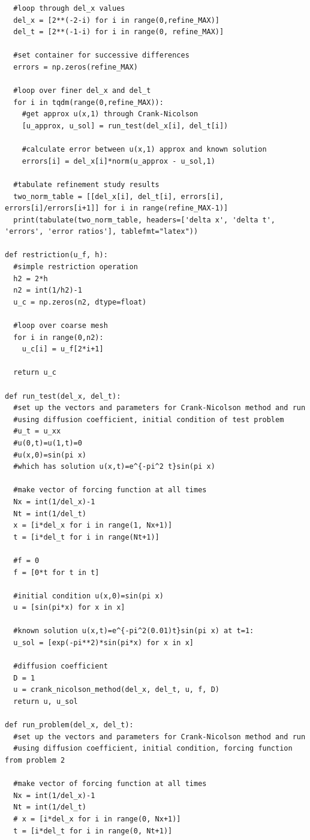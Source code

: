 \documentclass[12pt]{article}
\begin{document}
\begin{verbatim}
  #loop through del_x values
  del_x = [2**(-2-i) for i in range(0,refine_MAX)]
  del_t = [2**(-1-i) for i in range(0, refine_MAX)]

  #set container for successive differences
  errors = np.zeros(refine_MAX)

  #loop over finer del_x and del_t
  for i in tqdm(range(0,refine_MAX)):
    #get approx u(x,1) through Crank-Nicolson
    [u_approx, u_sol] = run_test(del_x[i], del_t[i])
    
    #calculate error between u(x,1) approx and known solution 
    errors[i] = del_x[i]*norm(u_approx - u_sol,1)

  #tabulate refinement study results
  two_norm_table = [[del_x[i], del_t[i], errors[i], errors[i]/errors[i+1]] for i in range(refine_MAX-1)]  
  print(tabulate(two_norm_table, headers=['delta x', 'delta t', 'errors', 'error ratios'], tablefmt="latex"))

def restriction(u_f, h):
  #simple restriction operation
  h2 = 2*h
  n2 = int(1/h2)-1
  u_c = np.zeros(n2, dtype=float)

  #loop over coarse mesh
  for i in range(0,n2):
    u_c[i] = u_f[2*i+1]
    
  return u_c

def run_test(del_x, del_t):
  #set up the vectors and parameters for Crank-Nicolson method and run
  #using diffusion coefficient, initial condition of test problem
  #u_t = u_xx
  #u(0,t)=u(1,t)=0
  #u(x,0)=sin(pi x)
  #which has solution u(x,t)=e^{-pi^2 t}sin(pi x)

  #make vector of forcing function at all times 
  Nx = int(1/del_x)-1
  Nt = int(1/del_t)
  x = [i*del_x for i in range(1, Nx+1)]
  t = [i*del_t for i in range(Nt+1)]
  
  #f = 0
  f = [0*t for t in t]
  
  #initial condition u(x,0)=sin(pi x)
  u = [sin(pi*x) for x in x]

  #known solution u(x,t)=e^{-pi^2(0.01)t}sin(pi x) at t=1:
  u_sol = [exp(-pi**2)*sin(pi*x) for x in x]

  #diffusion coefficient
  D = 1
  u = crank_nicolson_method(del_x, del_t, u, f, D)
  return u, u_sol 

def run_problem(del_x, del_t):
  #set up the vectors and parameters for Crank-Nicolson method and run
  #using diffusion coefficient, initial condition, forcing function from problem 2

  #make vector of forcing function at all times 
  Nx = int(1/del_x)-1
  Nt = int(1/del_t)
  # x = [i*del_x for i in range(0, Nx+1)]
  t = [i*del_t for i in range(0, Nt+1)]
  

\end{verbatim}
\end{document}
